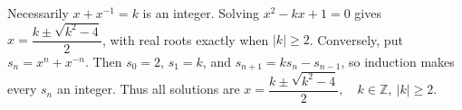 Necessarily $x+x^{-1}=k$ is an integer. Solving $x^2-kx+1=0$ gives $x=\dfrac{k\pm\sqrt{k^2-4}}{2}$, with real roots exactly when $|k|\ge2$. Conversely, put $s_n=x^n+x^{-n}$. Then $s_0=2$, $s_1=k$, and $s_{n+1}=ks_n-s_{n-1}$, so induction makes every $s_n$ an integer. Thus all solutions are $\boxed{x=\dfrac{k\pm\sqrt{k^2-4}}{2},\quad k\in\mathbb Z,\ |k|\ge2}$.

